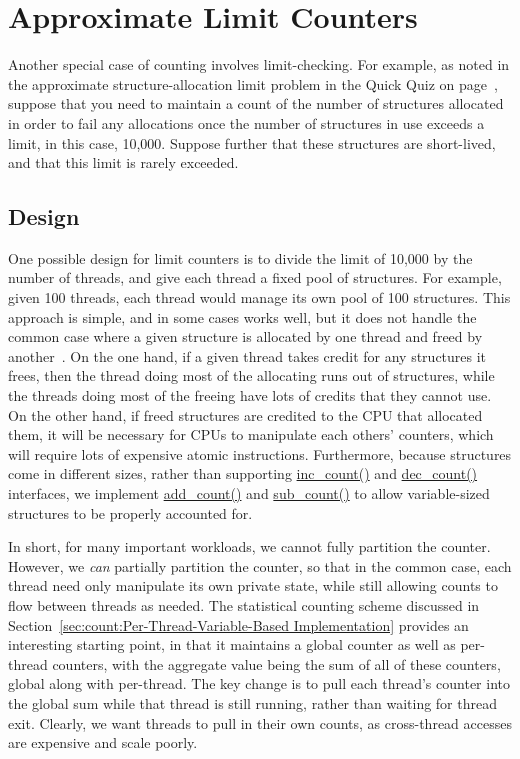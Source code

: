\section{Approximate Limit Counters}
\label{sec:count:Approximate Limit Counters}

Another special case of counting involves limit-checking.
For example, as noted in the approximate structure-allocation limit
problem in the Quick Quiz on
page~\pageref{chp:Counting},
suppose that you need to maintain a count of the number of
structures allocated in order to fail any allocations once the number
of structures in use exceeds a limit, in this case, 10,000.
Suppose further that these structures are short-lived, and that this
limit is rarely exceeded.

\subsection{Design}

One possible design for limit counters is to divide the limit of 10,000
by the number of threads, and give each thread a fixed pool of structures.
For example, given 100 threads, each thread would manage its own pool
of 100 structures.
This approach is simple, and in some cases works well, but it does not
handle the common case where a given structure is allocated by one
thread and freed by another~\cite{McKenney93}.
On the one hand, if a given thread takes credit for any structures it
frees, then the thread doing most of the allocating runs out
of structures, while the threads doing most of the freeing have lots
of credits that they cannot use.
On the other hand, if freed structures are credited to the CPU that
allocated them, it will be necessary for CPUs to manipulate each
others' counters, which will require lots of expensive atomic instructions.
Furthermore, because structures come in different sizes, rather than supporting
\url{inc_count()} and \url{dec_count()} interfaces, we implement
\url{add_count()} and \url{sub_count()} to allow variable-sized structures
to be properly accounted for.

In short, for many important workloads, we cannot fully partition the counter.
However, we \emph{can} partially partition the counter,
so that in the common case, each thread need only manipulate its own
private state,
while still allowing counts to flow between threads as needed.
The statistical counting scheme discussed in
Section~\ref{sec:count:Per-Thread-Variable-Based Implementation}
provides an interesting starting point,
in that it maintains a global counter as well as per-thread counters,
with the aggregate value being the sum of all of these counters,
global along with per-thread.
The key change is to pull each thread's counter into
the global sum while that thread is still running, rather than waiting
for thread exit.
Clearly, we want threads to pull in their own counts, as cross-thread
accesses are expensive and scale poorly.

